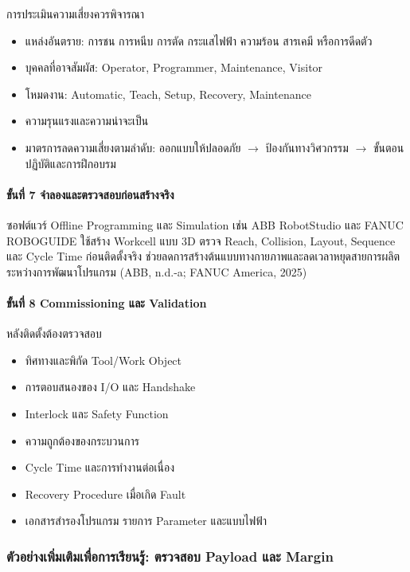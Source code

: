 การประเมินความเสี่ยงควรพิจารณา

\begin{itemize}
    \item แหล่งอันตราย: การชน การหนีบ การตัด กระแสไฟฟ้า ความร้อน สารเคมี หรือการดีดตัว
    \item บุคคลที่อาจสัมผัส: Operator, Programmer, Maintenance, Visitor
    \item โหมดงาน: Automatic, Teach, Setup, Recovery, Maintenance
    \item ความรุนแรงและความน่าจะเป็น
    \item มาตรการลดความเสี่ยงตามลำดับ: ออกแบบให้ปลอดภัย \(\rightarrow\) ป้องกันทางวิศวกรรม \(\rightarrow\) ขั้นตอนปฏิบัติและการฝึกอบรม
\end{itemize}

\paragraph{ขั้นที่ 7 จำลองและตรวจสอบก่อนสร้างจริง}

ซอฟต์แวร์ Offline Programming และ Simulation เช่น ABB RobotStudio และ FANUC ROBOGUIDE ใช้สร้าง Workcell แบบ 3D ตรวจ Reach, Collision, Layout, Sequence และ Cycle Time ก่อนติดตั้งจริง ช่วยลดการสร้างต้นแบบทางกายภาพและลดเวลาหยุดสายการผลิตระหว่างการพัฒนาโปรแกรม (ABB, n.d.-a; FANUC America, 2025)

\paragraph{ขั้นที่ 8 Commissioning และ Validation}

หลังติดตั้งต้องตรวจสอบ

\begin{itemize}
    \item ทิศทางและพิกัด Tool/Work Object
    \item การตอบสนองของ I/O และ Handshake
    \item Interlock และ Safety Function
    \item ความถูกต้องของกระบวนการ
    \item Cycle Time และการทำงานต่อเนื่อง
    \item Recovery Procedure เมื่อเกิด Fault
    \item เอกสารสำรองโปรแกรม รายการ Parameter และแบบไฟฟ้า
\end{itemize}

\subsubsection{ตัวอย่างเพิ่มเติมเพื่อการเรียนรู้: ตรวจสอบ Payload และ Margin}

